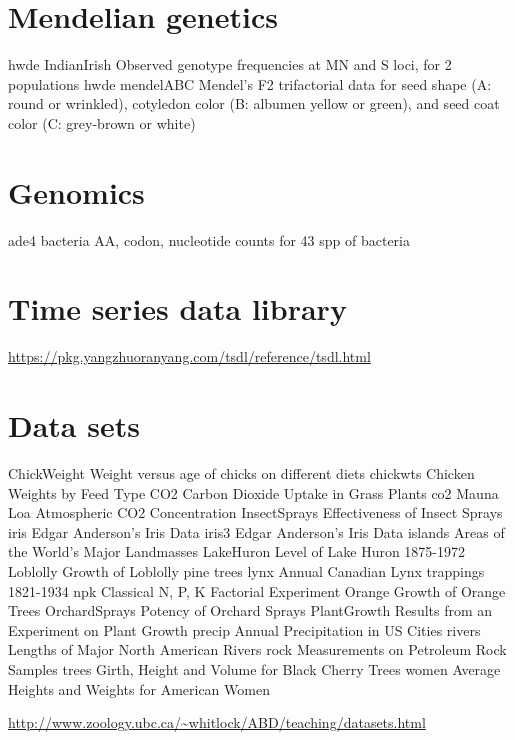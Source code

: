 \documentclass[
]{book}
\begin{document}
\hypertarget{mendelian-genetics}{%
\section{Mendelian genetics}\label{mendelian-genetics}}

hwde IndianIrish Observed genotype frequencies at MN and S loci, for 2 populations
hwde mendelABC Mendel's F2 trifactorial data for seed shape (A: round or wrinkled), cotyledon color (B: albumen yellow or green), and seed coat color (C: grey-brown or white)

\hypertarget{genomics}{%
\section{Genomics}\label{genomics}}

ade4 bacteria
AA, codon, nucleotide counts for 43 spp of bacteria

\hypertarget{time-series-data-library}{%
\section{Time series data library}\label{time-series-data-library}}

\url{https://pkg.yangzhuoranyang.com/tsdl/reference/tsdl.html}

\hypertarget{data-sets-1}{%
\section{Data sets}\label{data-sets-1}}

ChickWeight Weight versus age of chicks on different diets
chickwts Chicken Weights by Feed Type
CO2 Carbon Dioxide Uptake in Grass Plants
co2 Mauna Loa Atmospheric CO2 Concentration
InsectSprays Effectiveness of Insect Sprays
iris Edgar Anderson's Iris Data
iris3 Edgar Anderson's Iris Data
islands Areas of the World's Major Landmasses
LakeHuron Level of Lake Huron 1875-1972
Loblolly Growth of Loblolly pine trees
lynx Annual Canadian Lynx trappings 1821-1934
npk Classical N, P, K Factorial Experiment
Orange Growth of Orange Trees
OrchardSprays Potency of Orchard Sprays
PlantGrowth Results from an Experiment on Plant Growth
precip Annual Precipitation in US Cities
rivers Lengths of Major North American Rivers
rock Measurements on Petroleum Rock Samples
trees Girth, Height and Volume for Black Cherry Trees
women Average Heights and Weights for American Women

\url{http://www.zoology.ubc.ca/~whitlock/ABD/teaching/datasets.html}
\end{document}
